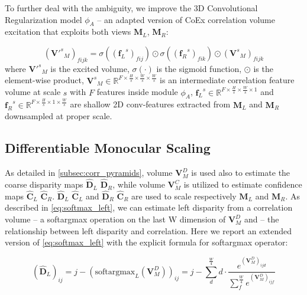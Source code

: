 \documentclass[10pt,twocolumn,letterpaper]{article}
\begin{document}
To further deal with the ambiguity, we improve the 3D Convolutional Regularization model $\phi_A$  -- an adapted version of CoEx \cite{bangunharcana2021correlate} correlation volume excitation that exploits both views $\textbf{M}_L$, $\textbf{M}_R$:

\small\begin{equation}
    ({\mathbf{V'}^s}_M)_{fijk} = \sigma\left(({{\mathbf{f}_L}^s})_{fij}\right) \odot \sigma\left(({{\mathbf{f}_R}^s})_{fik}\right) \odot ({\mathbf{V}^s}_M)_{fijk}
    \label{eq:our_coex}
\end{equation}\normalsize
where ${\mathbf{V'}^s}_M$ is the excited volume, $\sigma(\cdot)$ is the sigmoid function, $\odot$ is the element-wise product, ${\mathbf{V}^s}_M \in \mathbb{R}^{F \times \frac{H}{s} \times \frac{W}{s} \times \frac{W}{s}}$ is an intermediate correlation feature volume at scale $s$ with $F$ features inside module $\phi_A$,  ${\mathbf{f}_L}^s \in \mathbb{R}^{F \times \frac{H}{s} \times \frac{W}{s} \times 1}$ and ${\mathbf{f}_R}^s \in \mathbb{R}^{F \times \frac{H}{s} \times 1 \times \frac{W}{s}}$ are shallow 2D conv-features extracted from $\mathbf{M}_L$ and $\mathbf{M}_R$ downsampled at proper scale.

\subsection{Differentiable Monocular Scaling}
\label{subsec:diff_mono}

As detailed in \cref{subsec:corr_pyramids}, volume $\mathbf{V}^D_M$ is used also to estimate the coarse disparity maps $\hat{\mathbf{D}}_L$ $\hat{\mathbf{D}}_R$, while volume $\mathbf{V}^C_M$ is utilized to estimate confidence maps $\hat{\mathbf{C}}_L$ $\hat{\mathbf{C}}_R$.
$\hat{\mathbf{D}}_L$ $\hat{\mathbf{C}}_L$ and $\hat{\mathbf{D}}_R$ $\hat{\mathbf{C}}_R$ are used to scale respectively $\mathbf{M}_L$ and $\mathbf{M}_R$.
As described in \cref{eq:softmax_left}, we can estimate left disparity from a correlation volume  -- a softargmax operation on the last W dimension of $\mathbf{V}^D_M$ and  -- the relationship between left disparity and correlation.
Here we report an extended version of \cref{eq:softmax_left} with the explicit formula for softargmax operator:

\small\begin{equation}
    (\hat{\mathbf{D}}_L)_{ij} = j - \left(\text{softargmax}_L (\mathbf{V}^D_M )\right)_{ij} = j - \sum_{d}^{\frac{W}{4}} d \cdot \frac{e^{(\mathbf{V}^D_M)_{ijd}}}{\sum_{f}^{\frac{W}{4}} e^{(\mathbf{V}^D_M)_{ijf}}}
    \label{eq:softmax_left2}
\end{equation}\normalsize
\end{document}
